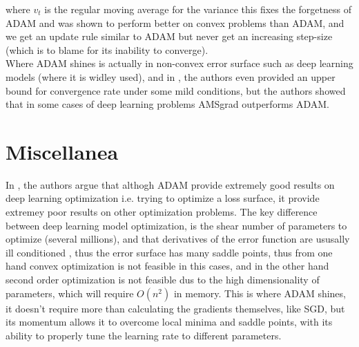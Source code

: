 \documentclass[10pt,a4paper]{article}
\begin{document}
where $v_t$ is the regular moving average for the variance
this fixes the forgetness of ADAM and was shown to perform better on convex problems than ADAM, and we get an update rule similar to ADAM but never get an increasing step-size (which is to blame for its inability to converge).\\
Where ADAM shines is actually in non-convex error surface such as deep learning models (where it is widley used), and in \cite{chen2018convergence}, the authors even provided an upper bound for convergence rate under some mild conditions, but the authors showed that in some cases of deep learning problems AMSgrad outperforms ADAM.
\section{Miscellanea}
In \cite{vaswani2019painless}, the authors argue that althogh ADAM provide extremely good results on deep learning optimization i.e. trying to optimize a loss surface, it provide extremey poor results on other optimization problems.
The key difference between deep learning model optimization, is the shear number of parameters to optimize (several millions), and that derivatives of the error function are ususally ill conditioned \cite{li2017visualizing}, thus the error surface has many saddle points, thus from one hand convex optimization is not feasible in this cases, and in the other hand second order optimization is not feasible dus to the high dimensionality of parameters, which will require $O(n^2)$ in memory. This is where ADAM shines, it doesn't require more than calculating the gradients themselves, like SGD, but its momentum allows it to overcome local minima and saddle points, with its ability to properly tune the learning rate to different parameters.


\end{document}
